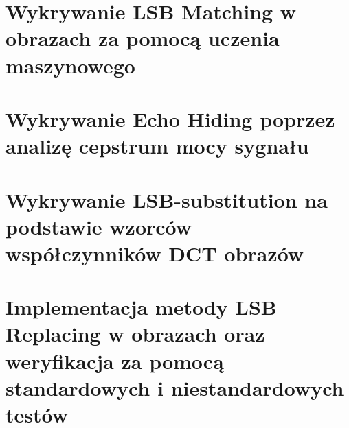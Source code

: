 \documentclass[a4paper,12pt]{article}
\begin{document}
\clearpage
\section{Wykrywanie LSB Matching w obrazach za pomocą uczenia maszynowego}


\clearpage
\section{Wykrywanie Echo Hiding poprzez analizę cepstrum mocy sygnału}


\clearpage
\section{Wykrywanie LSB-substitution na podstawie wzorców współczynników DCT obrazów}


\clearpage
\section{Implementacja metody LSB Replacing w obrazach oraz weryfikacja za pomocą standardowych i niestandardowych testów}


\clearpage
\printbibliography[title={Źródła}]
\end{document}
